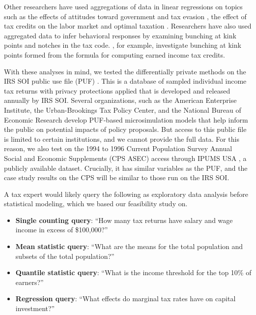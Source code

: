 Other researchers have used aggregations of data in linear regressions on topics such as the effects of attitudes toward government and tax evasion \citep{cullen2021political}, the effect of tax credits on the labor market \citep{tong2014impact} and optimal taxation \citep{piketty2014optimal}. Researchers have also used aggregated data to infer behavioral responses by examining bunching at kink points \citep{chetty2011adjustment} and notches \citep{kleven2013using} in the tax code. \citet{mortenson2020bunching}, for example, investigate bunching at kink points formed from the formula for computing earned income tax credits.

With these analyses in mind, we tested the differentially private methods on the IRS SOI public use file (PUF) \citep{barrientos2021}. This is a database of sampled individual income tax returns with privacy protections applied that is developed and released annually by IRS SOI. Several organizations, such as the American Enterprise Institute, the Urban-Brookings Tax Policy Center, and the National Bureau of Economic Research develop PUF-based microsimulation models that help inform the public on potential impacts of policy proposals. But access to this public file is limited to certain institutions, and we cannot provide the full data. For this reason, we also test on the 1994 to 1996 Current Population Survey Annual Social and Economic Supplements (CPS ASEC) access through IPUMS USA \cite{ruggles2021cps}, a publicly available dataset. Crucially, it has similar variables as the PUF, and the case study results on the CPS will be similar to those run on the IRS SOI.

A tax expert would likely query the following as exploratory data analysis before statistical modeling, which we based our feasibility study on.

\begin{itemize}
    \item \textbf{Single counting query}: ``How many tax returns have salary and wage income in excess of \$100,000?''
    \item \textbf{Mean statistic query}: ``What are the means for the total population and subsets of the total population?''
    \item \textbf{Quantile statistic query}: ``What is the income threshold for the top 10\% of earners?''
    \item \textbf{Regression query}: ``What effects do marginal tax rates have on capital investment?''
\end{itemize}


